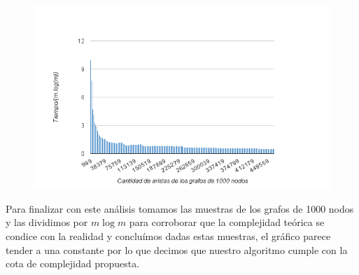 \newpage

 \begin{figure}[h!]
	\centering
 	\includegraphics[scale=0.8]{imagenes/ej3/mlogm1000.png}
 \end{figure}

 Para finalizar con este análisis tomamos las muestras de los grafos de 1000 nodos y las dividimos por $m\log{}m$ para corroborar que la complejidad teórica se condice con la realidad y concluímos dadas estas muestras, el gráfico parece tender a una constante por lo que decimos que nuestro algoritmo cumple con la cota de complejidad propuesta.